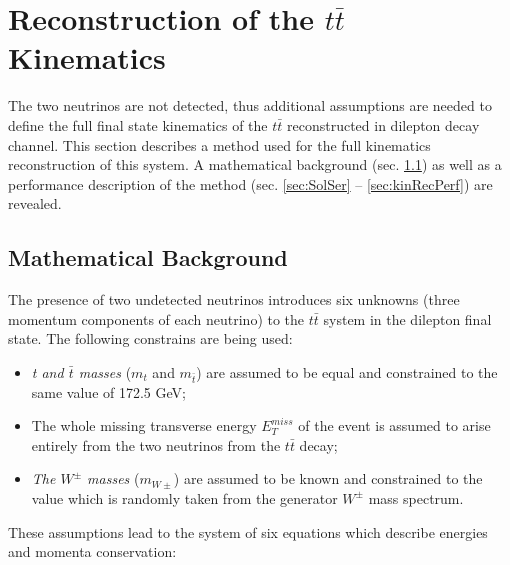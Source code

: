 \chapter{Reconstruction of the $t\bar{t}$ Kinematics}\label{chapt:kinReco}

The two neutrinos are not detected, thus additional
assumptions are needed to define the full final state kinematics of the $t\bar{t}$ reconstructed in dilepton decay channel.
This section describes a method used for the full kinematics reconstruction of this system. A mathematical
background (sec. \ref{sec:MatBg}) as well as a performance description of the method (sec. \ref{sec:SolSer} -- \ref{sec:kinRecPerf}) are revealed.

\section{Mathematical Background}\label{sec:MatBg}

The presence of two undetected neutrinos introduces six unknowns  (three momentum components of each neutrino)
to the $t\bar{t}$ system in the dilepton final state.
The following constrains are being used:

\begin{itemize}
 \item \textit{t and $\bar{t}$ masses} ($m_{t}$ and $m_ {\bar{t}}$) are assumed to be equal and constrained to the same value of 172.5 GeV\cite{PDG-2012};
 \item The whole missing transverse energy $E_{T}^{miss}$ of the event is assumed to arise entirely
 from the two neutrinos from the $t\bar{t}$ decay;
 \item \textit{The $W^{\pm}$ masses} ($m_{W\pm}$) are assumed to be known and constrained to the value which is randomly taken
 from the generator $W^{\pm}$ mass spectrum.
\end{itemize}

These assumptions lead to the system of six equations which describe energies and momenta conservation:


